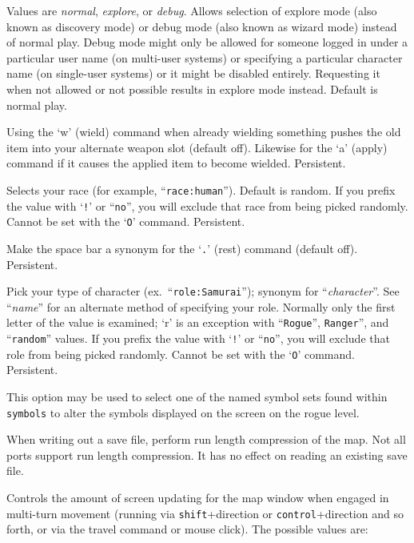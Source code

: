 Values are {\it normal\/}, {\it explore\/}, or {\it debug\/}.
Allows selection of explore mode (also known as discovery mode) or debug
mode (also known as wizard mode) instead of normal play.
Debug mode might only be allowed for someone logged in under a particular
user name (on multi-user systems) or specifying a particular character
name (on single-user systems) or it might be disabled entirely.  Requesting
it when not allowed or not possible results in explore mode instead.
Default is normal play.
\item[\ib{pushweapon}]
Using the `w' (wield) command when already wielding
something pushes the old item into your alternate weapon slot (default off).
Likewise for the `a' (apply) command if it causes the applied item to
become wielded.  Persistent.
\item[\ib{race}]
Selects your race (for example, ``{\tt race:human}'').  Default is random.
If you prefix the value with `{\tt !}' or ``{\tt no}'', you will
exclude that race from being picked randomly. 
Cannot be set with the `{\tt O}' command.  Persistent.
\item[\ib{rest\verb+_+on\verb+_+space}]
Make the space bar a synonym for the `{\tt .}' (rest) command (default off).
Persistent.
\item[\ib{role}]
Pick your type of character (ex.\ ``{\tt role:Samurai}'');
synonym for ``{\it character\/}''.  See ``{\it name\/}'' for an alternate method
of specifying your role.  Normally only the first letter of the
value is examined; `r' is an exception with ``{\tt Rogue}'', {\tt Ranger}'',
and ``{\tt random}'' values.
If you prefix the value with `{\tt !}' or ``{\tt no}'', you will
exclude that role from being picked randomly.
Cannot be set with the `{\tt O}' command.  Persistent.
\item[\ib{roguesymset}]
This option may be used to select one of the named symbol sets found within
{\tt symbols} to alter the symbols displayed on the screen on the
rogue level.
\item[\ib{rlecomp}]
When writing out a save file, perform run length compression of the map.
Not all ports support run length compression. It has no
effect on reading an existing save file.
\item[\ib{runmode}]
Controls the amount of screen updating for the map window when engaged
in multi-turn movement (running via {\tt shift}+direction
or {\tt control}+direction
and so forth, or via the travel command or mouse click).
The possible values are:

